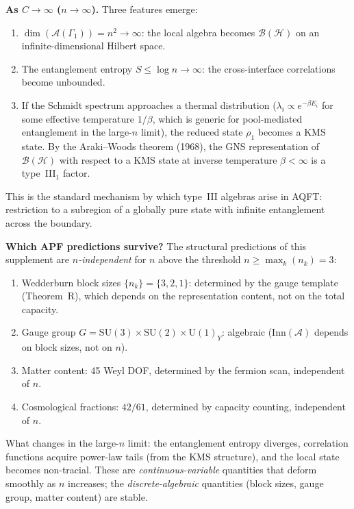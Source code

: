 \documentclass[11pt,a4paper]{article}
\theoremstyle{definition}
\newcommand{\SU}{\mathrm{SU}}
\newcommand{\U}{\mathrm{U}}
\begin{document}
\smallskip\noindent\textbf{As $C \to \infty$ ($n \to \infty$).}\quad
Three features emerge:
\begin{enumerate}[nosep,label=(\roman*)]
  \item $\dim(\mathcal{A}(\Gamma_1)) = n^2 \to \infty$: the local
  algebra becomes $\mathcal{B}(\mathcal{H})$ on an
  infinite-dimensional Hilbert space.
  \item The entanglement entropy $S \le \log n \to \infty$: the
  cross-interface correlations become unbounded.
  \item If the Schmidt spectrum approaches a thermal distribution
  ($\lambda_i \propto e^{-\beta E_i}$ for some effective temperature
  $1/\beta$, which is generic for pool-mediated entanglement in the
  large-$n$ limit), the reduced state $\rho_1$ becomes a KMS state.
  By the Araki--Woods theorem (1968), the GNS representation of
  $\mathcal{B}(\mathcal{H})$ with respect to a KMS state at inverse
  temperature $\beta < \infty$ is a type~III$_1$ factor.
\end{enumerate}
This is the standard mechanism by which type~III algebras arise in
AQFT: restriction to a subregion of a globally pure state with
infinite entanglement across the boundary.

\smallskip\noindent\textbf{Which APF predictions survive?}\quad
The structural predictions of this supplement are
\emph{$n$-independent} for $n$ above the threshold
$n \ge \max_k(n_k) = 3$:
\begin{enumerate}[nosep,label=(\alph*)]
  \item Wedderburn block sizes $\{n_k\} = \{3, 2, 1\}$: determined by
  the gauge template (Theorem~R), which depends on the representation
  content, not on the total capacity.
  \item Gauge group $G = \SU(3) \times \SU(2) \times \U(1)_Y$:
  algebraic ($\mathrm{Inn}(\mathcal{A})$ depends on block sizes, not
  on $n$).
  \item Matter content: 45 Weyl DOF, determined by the fermion scan,
  independent of $n$.
  \item Cosmological fractions: $42/61$, determined by capacity counting,
  independent of $n$.
\end{enumerate}
What changes in the large-$n$ limit: the entanglement entropy diverges,
correlation functions acquire power-law tails (from the KMS structure),
and the local state becomes non-tracial.  These are
\emph{continuous-variable} quantities that deform smoothly as $n$
increases; the \emph{discrete-algebraic} quantities (block sizes,
gauge group, matter content) are stable.
\end{document}

